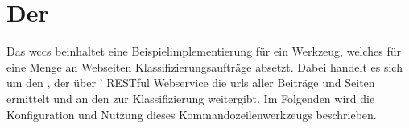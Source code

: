 \section{Der {\wordpressCrawler}}
    \label{section:solutionDetailsCrawler}
    Das \gls{wccs} beinhaltet eine Beispielimplementierung für ein Werkzeug,
    welches für eine Menge an Webseiten Klassifizierungsaufträge absetzt.
    Dabei handelt es sich um den {\wordpressCrawler},
    der über {\wordpress}' RESTful Webservice \cite[Kapitel "`REST API Handbook"']{wordpress:codex}
    die \glspl{url} aller Beiträge und Seiten ermittelt
    und an den {\classificationService}
    zur Klassifizierung weitergibt.
    Im Folgenden wird die Konfiguration und Nutzung dieses Kommandozeilenwerkzeugs beschrieben.

    
    
